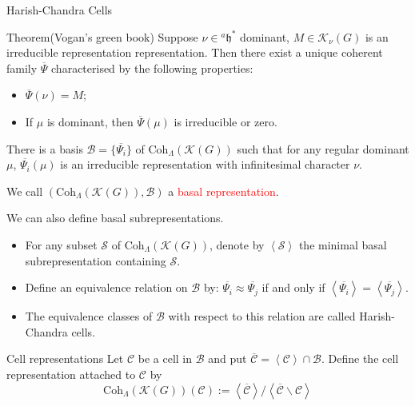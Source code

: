 \documentclass[fleqn,xcolor=dvipsnames]{beamer}
\newcommand{\CB}{{\mathcal {B}}}
\newcommand{\CC}{{\mathcal {C}}}
\newcommand{\CK}{{\mathcal {K}}}
\newcommand{\CS}{{\mathcal {S}}}
\newcommand{\fh}{\mathfrak{h}}
\renewcommand{\bar}{\overline}
\begin{document}
\begin{frame}{Harish-Chandra Cells}
  \begin{block}{Theorem(Vogan's green book)}
    Suppose $\nu \in {^{a}\fh}^*$ dominant, $M \in \CK_{\nu}(G)$ is an irreducible representation representation. Then there exist a unique coherent family $\bar{\Psi}$ characterised by the following properties:
    \begin{itemize}
      \item $\bar{\Psi}(\nu) = M$;
      \item If $\mu$ is dominant, then $\bar{\Psi}(\mu)$ is irreducible or zero.
    \end{itemize}
  \end{block}
  There is a basis $\CB = \{\bar{\Psi_i}\}$ of $\mathrm{Coh}_{\Lambda}(\CK(G))$ such that for any regular dominant $\mu$, $\bar{\Psi_i}(\mu)$ is an irreducible representation with infinitesimal character $\nu$.\par
  We call $(\mathrm{Coh}_{\Lambda}(\CK(G)),\CB)$ a \textcolor{red}{basal representation}.\par
  We can also define basal subrepresentations. 
\end{frame}






\begin{frame}
  \begin{itemize}
    \item For any subset $\CS$ of $\mathrm{Coh}_{\Lambda}(\CK(G))$, denote by $\left \langle \CS \right \rangle$ the minimal basal subrepresentation containing $\CS$.
    \item Define an equivalence relation on $\CB$ by: 
    $\bar{\Psi_i} \approx  \bar{\Psi_j}$ if and only if $\left \langle \bar{\Psi_i} \right \rangle = \left \langle \bar{\Psi_j} \right \rangle$.
    \item The equivalence classes of $\CB$ with respect to this relation are called Harish-Chandra cells.
  \end{itemize}
  
  
  
  \begin{block}{Cell representations}
    Let $\CC$ be a cell in $\CB$ and put $\bar{\CC} = \left \langle \CC \right \rangle \cap \CB$. Define the cell representation attached to $\CC$ by
    \[ \mathrm{Coh}_{\Lambda}(\CK(G))(\CC) := \left \langle \bar{\CC} \right \rangle  / \left \langle \bar{\CC} \backslash \CC \right \rangle\] 
  \end{block}


  
\end{frame}
\end{document}
